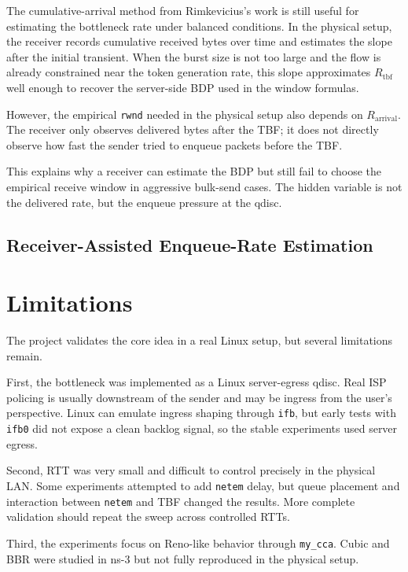 \documentclass{article}
\newcommand{\code}[1]{\texttt{#1}}
\begin{document}
The cumulative-arrival method from Rimkevicius's work is still useful for estimating the bottleneck rate under 
balanced conditions. In the physical setup, the receiver records cumulative received bytes over time and estimates the 
slope after the initial transient. When the burst size is not too large and the flow is already constrained near the 
token generation rate, this slope approximates \(R_{\mathrm{tbf}}\) well enough to recover the server-side BDP used in 
the window formulas.

However, the empirical \code{rwnd} needed in the physical setup also depends on \(R_{\mathrm{arrival}}\). The receiver 
only observes delivered bytes after the TBF; it does not directly observe how fast the sender tried to enqueue packets 
before the TBF.

This explains why a receiver can estimate the BDP but still fail to choose the empirical receive window in 
aggressive bulk-send cases. The hidden variable is not the delivered rate, but the enqueue pressure at the qdisc.

\subsection{Receiver-Assisted Enqueue-Rate Estimation}


\section{Limitations}

The project validates the core idea in a real Linux setup, but several limitations remain.

First, the bottleneck was implemented as a Linux server-egress qdisc. Real ISP policing is usually downstream 
of the sender and may be ingress from the user's perspective. Linux can emulate ingress shaping through \code{ifb}, 
but early tests with \code{ifb0} did not expose a clean backlog signal, so the stable experiments used server egress.

Second, RTT was very small and difficult to control precisely in the physical LAN. Some experiments attempted to 
add \code{netem} delay, but queue placement and interaction between \code{netem} and TBF changed the results. 
More complete validation should repeat the sweep across controlled RTTs.

Third, the experiments focus on Reno-like behavior through \code{my\_cca}. Cubic and BBR were studied in ns-3 
but not fully reproduced in the physical setup.
\end{document}
